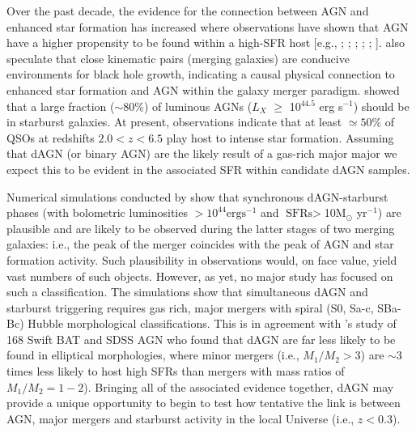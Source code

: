 Over the past decade, the evidence for the connection between AGN and enhanced star formation has increased where observations have shown that AGN have a higher propensity to be found within a high-SFR host [e.g., \cite{2001ApJ...555..719C}; \cite{2004MNRAS.352..399J}; \cite{Sanchez_2004}; \cite{2006AJ....131...84V}; \cite{2006AJZakamska1496Z}; \cite{2011MNRASKaviraj}]. \cite{2011ApJ...743....2S} also speculate that close kinematic pairs (merging galaxies) are conducive environments for black hole growth, indicating a causal physical connection to enhanced star formation and AGN within the galaxy merger paradigm. \cite{tini_Bongiorno_Piconcelli_2013} showed that a large fraction ($\sim{80}$\%) of luminous AGNs ($L_X$ $\ge$ 10$^{44.5}$ erg s$^{-1}$) should be in starburst galaxies. At present, observations indicate that at least $\simeq{50}$\% of QSOs at redshifts $2.0<z<6.5$ play host to intense star formation. Assuming that dAGN (or binary AGN) are the likely result of a gas-rich major major we expect this to be evident in the associated SFR within candidate dAGN samples.

Numerical simulations conducted by \cite{Dotti_Bellovary_Callegari_2012} show that synchronous dAGN-starburst phases (with bolometric luminosities $>10^{44}\text{erg}\text{s}^{-1}$ and $\text{SFRs}>$10M$_{\odot}$ yr$^{-1}$) are plausible and are likely to be observed during the latter stages of two merging galaxies: i.e., the peak of the merger coincides with the peak of AGN and star formation activity. Such plausibility in observations would, on face value, yield vast numbers of such objects. However, as yet, no major study has focused on such a classification. The \cite{Dotti_Bellovary_Callegari_2012} simulations show that simultaneous dAGN and starburst triggering requires gas rich, major mergers with spiral (S0, Sa-c, SBa-Bc) Hubble morphological classifications. This is in agreement with \cite{Koss_2012}'s study of 168 Swift BAT and SDSS AGN who found that dAGN are far less likely to be found in elliptical morphologies, where minor mergers (i.e., $M_{1}/M_{2}>3$) are $\sim{3}$ times less likely to host high SFRs than mergers with mass ratios of $M_{1}/M_{2}={1-2}$). Bringing all of the associated evidence together, dAGN may provide a unique opportunity to begin to test how tentative the link is between AGN, major mergers and starburst activity in the local Universe (i.e., $z<{0.3}$).             

